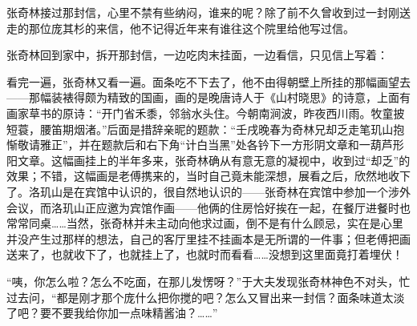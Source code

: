 \par 张奇林接过那封信，心里不禁有些纳闷，谁来的呢？除了前不久曾收到过一封刚送走的那位庞其杉的来信，他不记得近年来有谁往这个院里给他写过信。
\par 张奇林回到家中，拆开那封信，一边吃肉末挂面，一边看信，只见信上写着：
\par 看完一遍，张奇林又看一遍。面条吃不下去了，他不由得朝壁上所挂的那幅画望去——那幅装裱得颇为精致的国画，画的是晚唐诗人于《山村晓思》的诗意，上面有画家草书的原诗：“开门省禾黍，邻翁水头住。今朝南涧波，昨夜西川雨。牧童披短蓑，腰笛期烟渚。”后面是措辞亲昵的题款：“壬戌晚春为奇林兄却乏走笔玑山抱惭敬请雅正”，并在题款后和右下角“计白当黑”处各钤下一方形阴文章和一葫芦形阳文章。这幅画挂上的半年多来，张奇林确从有意无意的凝视中，收到过“却乏”的效果；不错，这幅画是老傅携来的，当时自己竟未能深想，展看之后，欣然地收下了。洛玑山是在宾馆中认识的，很自然地认识的——张奇林在宾馆中参加一个涉外会议，而洛玑山正应邀为宾馆作画——他俩的住房恰好挨在一起，在餐厅进餐时也常常同桌……当然，张奇林并未主动向他求过画，倒不是有什么顾忌，实在是心里并没产生过那样的想法，自己的客厅里挂不挂画本是无所谓的一件事；但老傅把画送来了，也就收下了，也就挂上了，也就时而看看……没想到这里面竟打着埋伏！
\par “咦，你怎么啦？怎么不吃面，在那儿发愣呀？”于大夫发现张奇林神色不对头，忙过去问，“都是刚才那个庞什么把你搅的吧？怎么又冒出来一封信？面条味道太淡了吧？要不要我给你加一点味精酱油？……”
